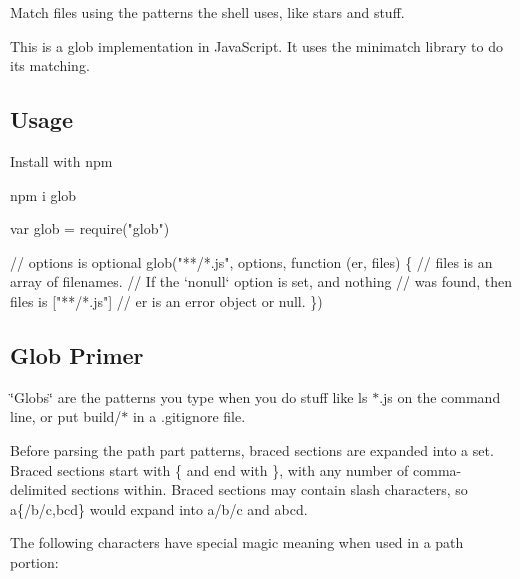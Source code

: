Match files using the patterns the shell uses, like stars and stuff.

\href{https://travis-ci.org/isaacs/node-glob/}{\tt } \href{https://ci.appveyor.com/project/isaacs/node-glob}{\tt } \href{https://coveralls.io/github/isaacs/node-glob?branch=master}{\tt }

This is a glob implementation in Java\+Script. It uses the {\ttfamily minimatch} library to do its matching.



\subsection*{Usage}

Install with npm


\begin{DoxyCode}
npm i glob
\end{DoxyCode}



\begin{DoxyCode}
var glob = require("glob")

// options is optional
glob("**/*.js", options, function (er, files) \{
  // files is an array of filenames.
  // If the `nonull` option is set, and nothing
  // was found, then files is ["**/*.js"]
  // er is an error object or null.
\})
\end{DoxyCode}


\subsection*{Glob Primer}

\char`\"{}\+Globs\char`\"{} are the patterns you type when you do stuff like {\ttfamily ls $\ast$.js} on the command line, or put {\ttfamily build/$\ast$} in a {\ttfamily .gitignore} file.

Before parsing the path part patterns, braced sections are expanded into a set. Braced sections start with {\ttfamily \{} and end with {\ttfamily \}}, with any number of comma-\/delimited sections within. Braced sections may contain slash characters, so {\ttfamily a\{/b/c,bcd\}} would expand into {\ttfamily a/b/c} and {\ttfamily abcd}.

The following characters have special magic meaning when used in a path portion\+:



